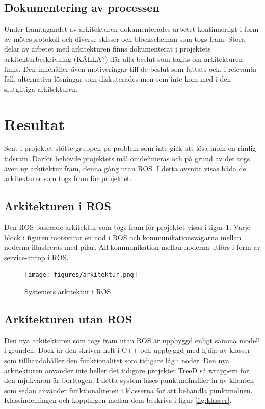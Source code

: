 \subsection{Dokumentering av processen}
Under framtagandet av arkitekturen dokumenterades arbetet kontinuerligt i form av mötesprotokoll och diverse skisser och blockscheman som togs fram. Stora delar av arbetet med arkitekturen finns dokumenterat i projektets arkitekturbeskrivning (KÄLLA?) där alla beslut som tagits om arkitekturen finns. Den innehåller även motiveringar till de beslut som fattats och, i relevanta fall, alternativa lösningar som diskuterades men som inte kom med i den slutgiltiga arkitekturen.


\section{Resultat}
\label{sec:results-lundberg}

Sent i projektet stötte gruppen på problem som inte gick att lösa inom en rimlig tidsram. Därför behövde projektets mål omdefinieras och på grund av det togs även ny arkitektur fram, denna gång utan ROS. I detta avsnitt visas båda de arkitekturer som togs fram för projektet. 

\subsection{Arkitekturen i ROS}
Den ROS-baserade arkitektur som togs fram för projektet visas i figur \ref{fig:arkitektur}. Varje block i figuren motsvarar en nod i ROS och kommunikationsvägarna mellan noderna illustreras med pilar. All kommunikation mellan noderna utförs i form av service-anrop i ROS.

\begin{figure}[h]
	\centering
	\texttt{[image: figures/arkitektur.png]}
	\caption{Systemets arkitektur i ROS.}
	\label{fig:arkitektur}
\end{figure}

\subsection{Arkitekturen utan ROS}

Den nya arkitekturen som togs fram utan ROS är uppbyggd enligt samma modell i grunden. Dock är den skriven helt i C++ och uppbyggd med hjälp av klasser som tillhandahåller den funktionalitet som tidigare låg i noder. Den nya arkitekturen använder inte heller det tidigare projektet TreeD så wrappern för den mjukvaran är borttagen. I detta system läses punktmolnsfiler in av klienten som sedan använder funktionaliteten i klasserna för att behandla punktmolnen. Klassindelningen och kopplingen mellan dem beskrivs i figur \ref{fig:klasser}.

